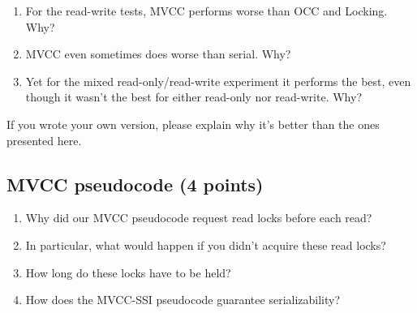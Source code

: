 \documentclass[11pt]{article}
\newcommand{\answer}[1]{}
\newcommand{\answer}[1]{{\color{black}\texttt{{a: - #1}}}}
\begin{document}
\begin{enumerate}
\item For the read-write tests, MVCC performs worse than OCC and Locking. Why? \\
\answer{your answer here...}
\vspace{10mm}

\item MVCC even sometimes does worse than serial. Why? \\
\answer{your answer here...}
\vspace{10mm}

\item Yet for the mixed read-only/read-write experiment it performs the best, even though it wasn't the best for either read-only nor read-write. Why? \\
\answer{your answer here...}
\vspace{10mm}

\end{enumerate}

If you wrote your own version, please explain why it's better than the ones presented here.


\subsection{MVCC pseudocode (4 points)}

\begin{enumerate}
\item Why did our MVCC pseudocode request read locks before each read? \\
\answer{your answer here...}
\vspace{10mm}

\item In particular, what would happen if you didn't acquire these read locks? \\
\answer{your answer here...}
\vspace{10mm}

\item How long do these locks have to be held? \\
\answer{your answer here...}
\vspace{10mm}

\item How does the MVCC-SSI pseudocode guarantee serializability? \\
\answer{your answer here...}
\vspace{10mm}

\end{enumerate}
\end{document}

